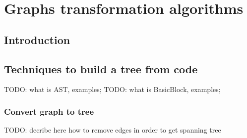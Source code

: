 \chapter{Graphs transformation algorithms}
\label{cha:Algorithms}

\section{Introduction}

\label{sec:topdown}
\section{Techniques to build a tree from code}
TODO: what is AST, examples;
TODO: what is BasicBlock, examples;

\subsection{Convert graph to tree}

TODO: decribe here how to remove edges in order to get spanning tree
\subsection{}
